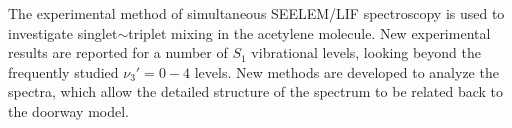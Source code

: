 







The experimental method of simultaneous SEELEM/LIF spectroscopy is
used to investigate singlet$\sim$triplet mixing in the acetylene
molecule.  New experimental results are reported for a number of $S_1$
vibrational levels, looking beyond the frequently studied $\nu_3'=0-4$
levels.  New methods are developed to analyze the spectra, which allow
the detailed structure of the spectrum to be related back to the
doorway model.


